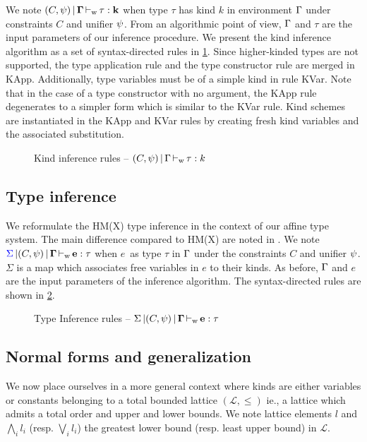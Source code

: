 We note $(C,\mathrm{\psi}) \operatorname{|} \bf{\Gamma} \operatorname{\vdash_w} \bf{\tau} : k$ when type $\tau$ has kind $k$
in environment $\Gamma$ under constraints $C$ and unifier $\mathrm{\psi}$. From an
algorithmic point of view, $\Gamma$ and $\tau$ are the input parameters of
our inference procedure.
We present the kind inference algorithm as a set of syntax-directed rules in
\cref{rules:kinding}.
Since higher-kinded types are not supported, the type application
rule and the type constructor rule are merged in {\sc KApp}.
Additionally, type variables must be of a simple kind in rule {\sc KVar}.
Note that in the case of a type constructor with no argument, the {\sc KApp}
rule degenerates to a simpler form which is similar to the {\sc KVar} rule.
Kind schemes are instantiated in the {\sc KApp} and {\sc KVar} rules by creating
fresh kind variables and the associated substitution.

\begin{figure}[h]
  \centering
  
  \caption{Kind inference rules -- $(C,\mathrm{\psi}) \operatorname{|} \Gamma \operatorname{\vdash_w} \tau : k$}
  \label{rules:kinding}
\end{figure}


\subsection{Type inference}

We reformulate the HM(X) type inference in the context of our affine type
system. The main difference compared to HM(X) are noted in .
We note ${\color{blue}{\Sigma}} \operatorname{|} (C,\mathrm{\psi}) \operatorname{|} \bf{\Gamma} \operatorname{\vdash_w} \bf{e} : \tau$ when
$e$\ as type $\tau$ in $\Gamma$ under the constraints $C$ and unifier $\mathrm{\psi}$.
$\Sigma$ is a map which associates free variables in $e$ to
their kinds.
As before, $\Gamma$ and $e$ are the input parameters of the inference
algorithm. The syntax-directed rules are shown in \cref{rules:typing}.

\begin{figure*}[h]
  
  \caption{Type Inference rules -- $\Sigma \operatorname{|} (C,\psi) \operatorname{|} \bf{\Gamma} \operatorname{\vdash_w} \bf{e} : \tau$ }
  \label{rules:typing}
\end{figure*}

\subsection{Normal forms and generalization}
\label{sec:normalize}

\newcommand\lub\bigvee
\newcommand\glb\bigwedge

We now place ourselves in a more general context where kinds are either variables
or constants belonging to a total bounded lattice $(\mathcal L, \leq)$ ie.,
a lattice which admits a total order and upper and lower bounds.
We note lattice elements $l$ and $\glb_i l_i$ (resp. $\lub_i l_i$)
the greatest lower bound (resp. least upper bound) in $\mathcal L$.

